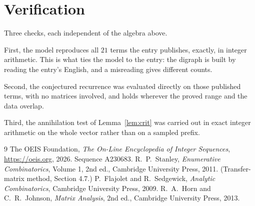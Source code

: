 \documentclass[11pt,a4paper]{article}
\theoremstyle{plain}
\theoremstyle{definition}
\begin{document}
\section{Verification}

Three checks, each independent of the algebra above.

First, the model reproduces all $21$ terms the entry publishes, exactly, in integer
arithmetic. This is what ties the model to the entry: the digraph is built by reading the
entry's English, and a misreading gives different counts.

Second, the conjectured recurrence was evaluated directly on those published terms, with no
matrices involved, and holds wherever the proved range and the data overlap.

Third, the annihilation test of Lemma~\ref{lem:crit} was carried out in exact integer
arithmetic on the whole vector rather than on a sampled prefix.

\begin{thebibliography}{9}
 The OEIS Foundation, \emph{The On-Line Encyclopedia of Integer
Sequences}, \url{https://oeis.org}, 2026. Sequence A230683.
 R.~P.~Stanley, \emph{Enumerative Combinatorics}, Volume 1, 2nd ed.,
Cambridge University Press, 2011. (Transfer-matrix method, Section 4.7.)
 P.~Flajolet and R.~Sedgewick, \emph{Analytic Combinatorics}, Cambridge
University Press, 2009.
 R.~A.~Horn and C.~R.~Johnson, \emph{Matrix Analysis}, 2nd ed., Cambridge
University Press, 2013.
\end{thebibliography}
\end{document}
